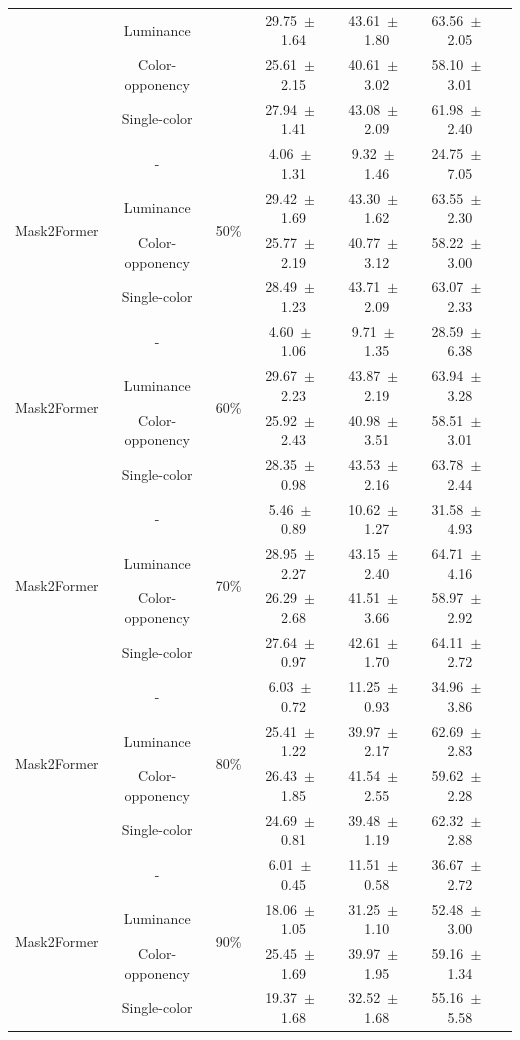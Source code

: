 \begin{table}[h]
\begin{tabular}{@{}lccc ccc@{}}
& Luminance & & 29.75~$\pm$~1.64 & 43.61~$\pm$~1.80 & 63.56~$\pm$~2.05 \\
& Color-opponency & & 25.61~$\pm$~2.15 & 40.61~$\pm$~3.02 & 58.10~$\pm$~3.01 \\
& Single-color & & 27.94~$\pm$~1.41 & 43.08~$\pm$~2.09 & 61.98~$\pm$~2.40 \\
\midrule
\multirow{4}{*}{Mask2Former} & - & \multirow{4}{*}{50\%} & 4.06~$\pm$~1.31 & 9.32~$\pm$~1.46 & 24.75~$\pm$~7.05 \\
& Luminance & & 29.42~$\pm$~1.69 & 43.30~$\pm$~1.62 & 63.55~$\pm$~2.30 \\
& Color-opponency & & 25.77~$\pm$~2.19 & 40.77~$\pm$~3.12 & 58.22~$\pm$~3.00 \\
& Single-color & & 28.49~$\pm$~1.23 & 43.71~$\pm$~2.09 & 63.07~$\pm$~2.33 \\
\midrule
\multirow{4}{*}{Mask2Former} & - & \multirow{4}{*}{60\%} & 4.60~$\pm$~1.06 & 9.71~$\pm$~1.35 & 28.59~$\pm$~6.38 \\
& Luminance & & 29.67~$\pm$~2.23 & 43.87~$\pm$~2.19 & 63.94~$\pm$~3.28 \\
& Color-opponency & & 25.92~$\pm$~2.43 & 40.98~$\pm$~3.51 & 58.51~$\pm$~3.01 \\
& Single-color & & 28.35~$\pm$~0.98 & 43.53~$\pm$~2.16 & 63.78~$\pm$~2.44 \\
\midrule
\multirow{4}{*}{Mask2Former} & - & \multirow{4}{*}{70\%} & 5.46~$\pm$~0.89 & 10.62~$\pm$~1.27 & 31.58~$\pm$~4.93 \\
& Luminance & & 28.95~$\pm$~2.27 & 43.15~$\pm$~2.40 & 64.71~$\pm$~4.16 \\
& Color-opponency & & 26.29~$\pm$~2.68 & 41.51~$\pm$~3.66 & 58.97~$\pm$~2.92 \\
& Single-color & & 27.64~$\pm$~0.97 & 42.61~$\pm$~1.70 & 64.11~$\pm$~2.72 \\
\midrule
\multirow{4}{*}{Mask2Former} & - & \multirow{4}{*}{80\%} & 6.03~$\pm$~0.72 & 11.25~$\pm$~0.93 & 34.96~$\pm$~3.86 \\
& Luminance & & 25.41~$\pm$~1.22 & 39.97~$\pm$~2.17 & 62.69~$\pm$~2.83 \\
& Color-opponency & & 26.43~$\pm$~1.85 & 41.54~$\pm$~2.55 & 59.62~$\pm$~2.28 \\
& Single-color & & 24.69~$\pm$~0.81 & 39.48~$\pm$~1.19 & 62.32~$\pm$~2.88 \\
\midrule
\multirow{4}{*}{Mask2Former} & - & \multirow{4}{*}{90\%} & 6.01~$\pm$~0.45 & 11.51~$\pm$~0.58 & 36.67~$\pm$~2.72 \\
& Luminance & & 18.06~$\pm$~1.05 & 31.25~$\pm$~1.10 & 52.48~$\pm$~3.00 \\
& Color-opponency & & 25.45~$\pm$~1.69 & 39.97~$\pm$~1.95 & 59.16~$\pm$~1.34 \\
& Single-color & & 19.37~$\pm$~1.68 & 32.52~$\pm$~1.68 & 55.16~$\pm$~5.58 \\
\midrule
\bottomrule
\end{tabular}
\label{tab:sparse_results_mask2former_acdc_night}
\end{table}